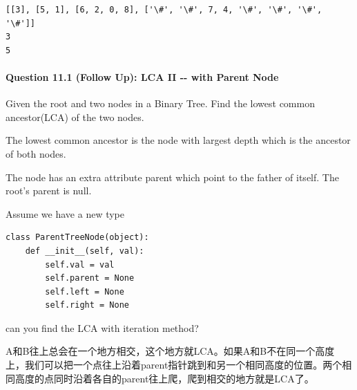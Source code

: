 \documentclass[11pt]{article}
\begin{document}
    \begin{Verbatim}[commandchars=\\\{\}]
[[3], [5, 1], [6, 2, 0, 8], ['\#', '\#', 7, 4, '\#', '\#', '\#', '\#']]
3
5

    \end{Verbatim}

    \paragraph{Question 11.1 (Follow Up): LCA II -\/- with Parent
Node}\label{question-11.1-follow-up-lca-ii----with-parent-node}

Given the root and two nodes in a Binary Tree. Find the lowest common
ancestor(LCA) of the two nodes.

The lowest common ancestor is the node with largest depth which is the
ancestor of both nodes.

The node has an extra attribute parent which point to the father of
itself. The root's parent is null.

Assume we have a new type

\begin{verbatim}
class ParentTreeNode(object):
    def __init__(self, val):
        self.val = val
        self.parent = None
        self.left = None
        self.right = None
\end{verbatim}

can you find the LCA with iteration method?

A和B往上总会在一个地方相交，这个地方就LCA。如果A和B不在同一个高度上，我们可以把一个点往上沿着parent指针跳到和另一个相同高度的位置。两个相同高度的点同时沿着各自的parent往上爬，爬到相交的地方就是LCA了。
\end{document}
